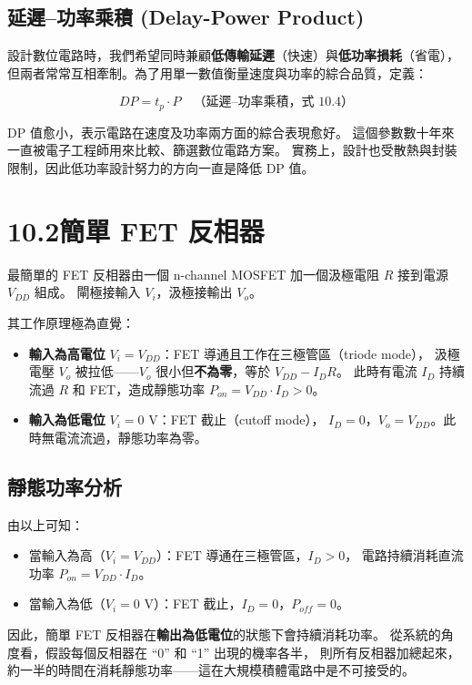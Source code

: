 \documentclass[12pt]{article}
\begin{document}
\subsection*{延遲--功率乘積 (Delay-Power Product)}

設計數位電路時，我們希望同時兼顧\textbf{低傳輸延遲}（快速）與\textbf{低功率損耗}（省電），
但兩者常常互相牽制。為了用單一數值衡量速度與功率的綜合品質，定義：

\begin{formulabox}
\[
  DP = t_p \cdot P \quad\text{（延遲--功率乘積，式 10.4）}
\]
\end{formulabox}

DP 值愈小，表示電路在速度及功率兩方面的綜合表現愈好。
這個參數數十年來一直被電子工程師用來比較、篩選數位電路方案。
實務上，設計也受散熱與封裝限制，因此低功率設計努力的方向一直是降低 DP 值。

\section*{10.2\quad 簡單 FET 反相器}

\begin{keybox}
最簡單的 FET 反相器由一個 n-channel MOSFET 加一個汲極電阻 $R$ 接到電源 $V_{DD}$ 組成。
閘極接輸入 $V_i$，汲極接輸出 $V_o$。


其工作原理極為直覺：
\begin{itemize}[leftmargin=2.2em,itemsep=2pt]
  \item \textbf{輸入為高電位} $V_i = V_{DD}$：FET 導通且工作在三極管區（triode mode），
    汲極電壓 $V_o$ 被拉低——$V_o$ 很小但\textbf{不為零}，等於 $V_{DD} - I_D R$。
    此時有電流 $I_D$ 持續流過 $R$ 和 FET，造成靜態功率 $P_{on} = V_{DD} \cdot I_D > 0$。
  \item \textbf{輸入為低電位} $V_i = 0$ V：FET 截止（cutoff mode），
    $I_D = 0$，$V_o = V_{DD}$。此時無電流流過，靜態功率為零。
\end{itemize}
\end{keybox}

\subsection*{靜態功率分析}

由以上可知：
\begin{itemize}[leftmargin=2.2em,itemsep=2pt]
  \item 當輸入為高（$V_i = V_{DD}$）：FET 導通在三極管區，$I_D > 0$，
    電路持續消耗直流功率 $P_{on} = V_{DD} \cdot I_D$。
  \item 當輸入為低（$V_i = 0$ V）：FET 截止，$I_D = 0$，$P_{off} = 0$。
\end{itemize}
因此，簡單 FET 反相器在\textbf{輸出為低電位}的狀態下會持續消耗功率。
從系統的角度看，假設每個反相器在 ``0'' 和 ``1'' 出現的機率各半，
則所有反相器加總起來，約一半的時間在消耗靜態功率——這在大規模積體電路中是不可接受的。
\end{document}
